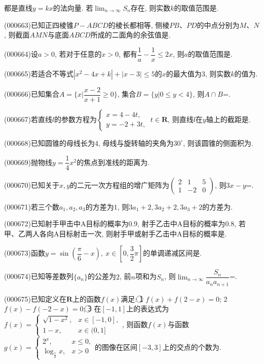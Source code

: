 都是直线$y=kx$的法向量. 若$\displaystyle\lim_{n\to\infty}S_n$存在, 则实数$k$的取值范围是.
\item (000663)已知正四棱锥$P-ABCD$的棱长都相等, 侧棱$PB$、$PD$的中点分别为$M$、$N$, 则截面$AMN$与底面$ABCD$所成的二面角的余弦值是.
\item (000664)设$a>0$, 若对于任意的$x>0$, 都有$\dfrac1a-\dfrac1x\le 2x$, 则$a$的取值范围是.
\item (000665)若适合不等式$|x^2-4x+k|+|x-3|\le 5$的$x$的最大值为$3$, 则实数$k$的值为.
\item (000666)已知集合$A=\{x|\dfrac{x-2}{x+1}\ge 0\}$, 集合$B=\{y|0 \le y<4\}$, 则$A\cap B$=.
\item (000667)若直线$l$的参数方程为$\begin{cases} x=4-4t,  \\ y=-2+3t,\end{cases} \  t\in \mathbf{R}$, 则直线$l$在$y$轴上的截距是.
\item (000668)已知圆锥的母线长为$4$, 母线与旋转轴的夹角为$30^\circ$, 则该圆锥的侧面积为.
\item (000669)抛物线$y=\dfrac14{x^2}$的焦点到准线的距离为.
\item (000670)已知关于$x,y$的二元一次方程组的增广矩阵为$\begin{pmatrix} 2 & 1 & 5  \\ 1 & -2 & 0 \end{pmatrix}$, 则$3x-y$=.
\item (000671)若三个数$a_1,a_2,a_3$的方差为$1$, 则$3a_1+2,3a_2+2,3a_3+2$的方差为.
\item (000672)已知射手甲击中A目标的概率为$0.9$, 射手乙击中A目标的概率为$0.8$, 若甲、乙两人各向A目标射击一次, 则射手甲或射手乙击中A目标的概率是.
\item (000673)函数$y=\sin (\dfrac{\pi}6-x), \ x\in [0,\dfrac32\pi]$的单调递减区间是.
\item (000674)已知等差数列$\{a_n\}$的公差为$2$, 前$n$项和为$S_n$, 则$\displaystyle\lim_{n\to\infty}\dfrac{S_n}{{a_n}{a_{n+1}}}$=.
\item (000675)已知定义在$\mathbf{R}$上的函数$f(x)$满足: \textcircled{1} $f(x)+f(2-x)=0$; \textcircled{2} $f(x)-f(-2-x)=0$; \textcircled{3} 在$[-1,1]$上的表达式为$f(x)=\begin{cases} \sqrt{1-x^2}, & x\in [-1,0], \\ 1-x, & x\in (0,1] \end{cases}$, 则函数$f(x)$与函数$g(x)=\begin{cases} 2^x, & x\le 0, \\ \log_{\frac12} x,& x>0 \end{cases}$的图像在区间$[-3,3]$上的交点的个数为.

